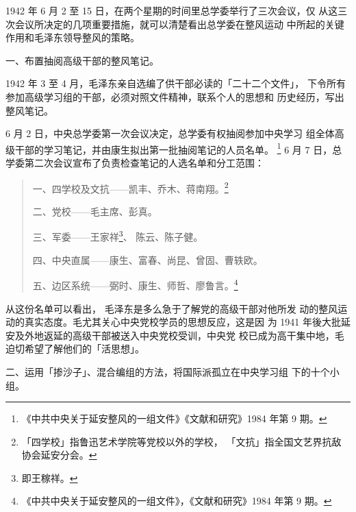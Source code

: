 1942 年 6 月 2 至 15 日，在两个星期的时间里总学委举行了三次会议，仅
从这三次会议所决定的几项重要措施，就可以清楚看出总学委在整风运动
中所起的关键作用和毛泽东领导整风的策略。

一、布置抽阅高级干部的整风笔记。

1942 年 3 至 4 月，毛泽东亲自选编了供干部必读的「二十二个文件」，
下令所有参加高级学习组的干部，必须对照文件精神，联系个人的思想和
历史经历，写出整风笔记。

6 月 2 日，中央总学委第一次会议决定，总学委有权抽阅参加中央学习
组全体高级干部的学习笔记，并由康生拟出第一批抽阅笔记的人员名单。
\footnote{《中共中央关于延安整风的一组文件》《文献和研究》1984 年第 9
期。}
6 月 7 日，总学委第二次会议宣布了负责检查笔记的人选名单和分工范围：
\begin{quote}
{\fzwkai 一、四学校及文抗——凯丰、乔木、蒋南翔。\footnote{「四学校」指鲁迅艺术学院等党校以外的学校，
「文抗」指全国文艺界抗敌协会延安分会。
} 

二、党校——毛主席、彭真。

三、军委——王家祥\footnote{即王稼祥。}、 陈云、陈子健。

四、中央直属——康生、富春、尚昆、曾固、曹轶欧。

五、边区系统——弼时、康生、师哲、廖鲁言。\footnote{《中共中央关于延安整风的一组文件》，《文献和研究》1984 年第 9 期。
} }
\end{quote}

从这份名单可以看出，
毛泽东是多么急于了解党的高级干部对他所发
动的整风运动的真实态度。毛尤其关心中央党校学员的思想反应，这是因
为 1941 年後大批延安及外地返延的高级干部被送入中央党校受训，中央党
校已成为高干集中地，毛迫切希望了解他们的「活思想」。

二、运用「掺沙子」、混合编组的方法，将国际派孤立在中央学习组
下的十个小组。

